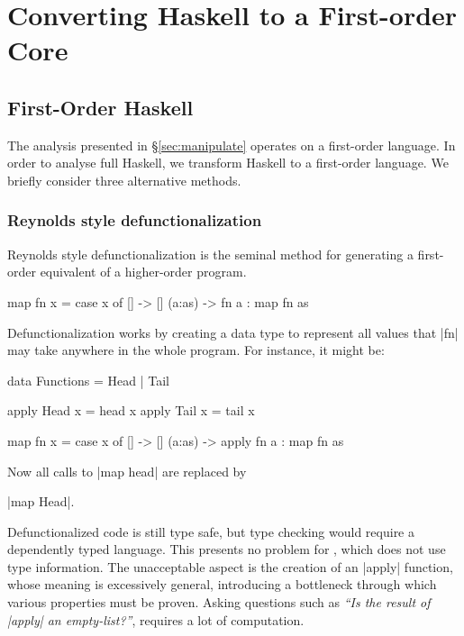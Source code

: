 \section{Converting Haskell to a First-order Core}
\label{sec:transform}



\subsection{First-Order Haskell}

The analysis presented in \S\ref{sec:manipulate} operates on a first-order language. In order to analyse full Haskell, we transform Haskell to a first-order language. We briefly consider three alternative methods.

\subsubsection{Reynolds style defunctionalization}

Reynolds style defunctionalization \citep{reynolds:defunc} is the seminal method for generating a first-order equivalent of a higher-order program.

\begin{example}
\begin{code}
map fn x = case  x of
                 []      -> []
                 (a:as)  -> fn a : map fn as
\end{code}

\noindent Defunctionalization works by creating a data type to represent all values that |fn| may take anywhere in the whole program. For instance, it might be:

\ignore\begin{code}
data Functions = Head | Tail

apply Head  x = head  x
apply Tail  x = tail  x

map fn x = case  x of
                 []      -> []
                 (a:as)  -> apply fn a : map fn as
\end{code}

\noindent Now all calls to |map head| are replaced by \ignore|map Head|.
\end{example}

Defunctionalized code is still type safe, but type checking would require a dependently typed language. This presents no problem for \catch{}, which does not use type information. The unacceptable aspect is the creation of an |apply| function, whose meaning is excessively general, introducing a bottleneck through which various properties must be proven. Asking questions such as \textit{``Is the result of |apply| an empty-list?''}, requires a lot of computation.

